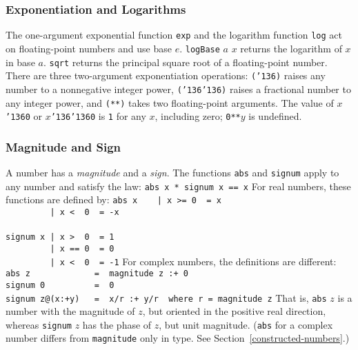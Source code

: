 {\subsubsection{Exponentiation and Logarithms}

The one-argument exponential function \mbox{\tt exp} and the
logarithm function \mbox{\tt log} act on floating-point numbers and
use base $e$.  \mbox{\tt logBase} $a$ $x$ returns the
logarithm of $x$ in base $a$.  \mbox{\tt sqrt} returns the
principal square root of a floating-point number.
There are three two-argument exponentiation operations:
\mbox{\tt ({\char'136})} raises any
number to a nonnegative integer power,
\mbox{\tt ({\char'136}{\char'136})} raises a
fractional number to any integer power, and \mbox{\tt (**)}\indextt{**}
takes two floating-point arguments.  The value of $x$\mbox{\tt {\char'136}0} or $x$\mbox{\tt {\char'136}{\char'136}0}
is \mbox{\tt 1} for any $x$, including zero; \mbox{\tt 0**}$y$ is undefined.
  
\subsubsection{Magnitude and Sign}
\label{magnitude-sign}

A number has a {\em magnitude}
and a {\em sign}.  The functions \mbox{\tt abs} and
\mbox{\tt signum} apply to any number and satisfy the law:
\bprog
\mbox{\tt abs\ x\ *\ signum\ x\ ==\ x}
\eprog
For real numbers, these functions are defined by:
\bprog
\mbox{\tt abs\ x\ \ \ \ |\ x\ >=\ 0\ \ =\ x}\\
\mbox{\tt \ \ \ \ \ \ \ \ \ |\ x\ <\ \ 0\ \ =\ -x}\\
\mbox{\tt }\\[-8pt]
\mbox{\tt signum\ x\ |\ x\ >\ \ 0\ \ =\ 1}\\
\mbox{\tt \ \ \ \ \ \ \ \ \ |\ x\ ==\ 0\ \ =\ 0}\\
\mbox{\tt \ \ \ \ \ \ \ \ \ |\ x\ <\ \ 0\ \ =\ -1}
\eprog
For complex numbers, the definitions are different:\nopagebreak
\bprog
\mbox{\tt abs\ z\ \ \ \ \ \ \ \ \ \ \ \ \ =\ \ magnitude\ z\ :+\ 0}\\
\mbox{\tt signum\ 0\ \ \ \ \ \ \ \ \ \ =\ \ 0}\\
\mbox{\tt signum\ z@(x:+y)\ \ \ =\ \ x/r\ :+\ y/r\ \ where\ r\ =\ magnitude\ z}
\eprog
That is, \mbox{\tt abs} $z$ is a number with the magnitude of $z$, but oriented
in the positive real direction, whereas \mbox{\tt signum} $z$ has the phase of
$z$, but unit magnitude.  (\mbox{\tt abs} for a complex number differs from
\mbox{\tt magnitude} only in type.  See Section~\ref{constructed-numbers}.)

}
